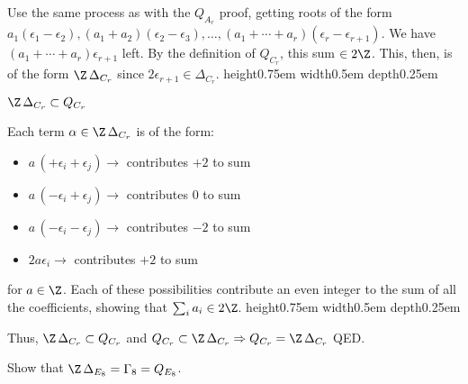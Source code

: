 \documentclass[11pt]{article}
\newenvironment{proof}[1][Proof]{\begin{trivlist}
\item[\hskip \labelsep {\bfseries #1}]}{\end{trivlist}}
\newenvironment{exercise}[1][Exercise]{\begin{trivlist}
\item[\hskip \labelsep {\bfseries #1}]}{\end{trivlist}}
\newenvironment{solution}[1][Solution]{\begin{trivlist}
\item[\hskip \labelsep {\bfseries #1}]}{\end{trivlist}}
\newenvironment{claim}[1][Claim]{\begin{trivlist}
\item[\hskip \labelsep {\bfseries #1}]}{\end{trivlist}}
\newcommand{\qed}{\nobreak \ifvmode \relax \else
      \ifdim\lastskip<1.5em \hskip-\lastskip
      \hskip1.5em plus0em minus0.5em \fi \nobreak
      \vrule height0.75em width0.5em depth0.25em\fi}
\begin{document}
\begin{solution}
\begin{proof}
Use the same process as with the $Q_{A_r}$ proof, getting roots of
the form $a_1 (\epsilon_1 - \epsilon_2),
(a_1+a_2)(\epsilon_2-\epsilon_3),\ldots,(a_1+\cdots+a_r)(\epsilon_r
- \epsilon_{r+1})$.  We have $(a_1+\cdots+a_r)\epsilon_{r+1}$
left.  By the definition of $Q_{C_r}$, this sum $\in 2 \Z$.  This,
then, is of the form $\Z \, \Delta_{C_r}$ since $2 \epsilon_{r+1}
\in \Delta_{C_r}$.\qed
\end{proof}
%
\begin{claim}$\Z \, \Delta_{C_r} \subset Q_{C_r}$\end{claim}
\begin{proof}
Each term $\alpha \in \Z \, \Delta_{C_r}$ is of the form:
%
\begin{itemize}
\item $ a \,(+\epsilon_i + \epsilon_j) \rightarrow $ contributes
$+2$ to sum \item $a \,(-\epsilon_i + \epsilon_j) \rightarrow $
contributes $0$ to sum \item $a \,(-\epsilon_i - \epsilon_j)
\rightarrow $ contributes $-2$ to sum \item $2 a \epsilon_i
\rightarrow $ contributes $+2$ to sum
\end{itemize}
for $a \in \Z$.  Each of these possibilities contribute an even
integer to the sum of all the coefficients, showing that $\sum_i
a_i \in 2 \Z$. \qed
\end{proof}
%
Thus, $\Z \, \Delta_{C_r} \subset Q_{C_r}$ and $Q_{C_r} \subset \Z
\, \Delta_{C_r} \Rightarrow Q_{C_r} = \Z \, \Delta_{C_r}$ QED.
\end{solution}
%
%
\begin{exercise}
Show that $\Z \, \Delta_{E_8} = \Gamma_8 = Q_{E_8}$.
\end{exercise}
%
\end{document}
